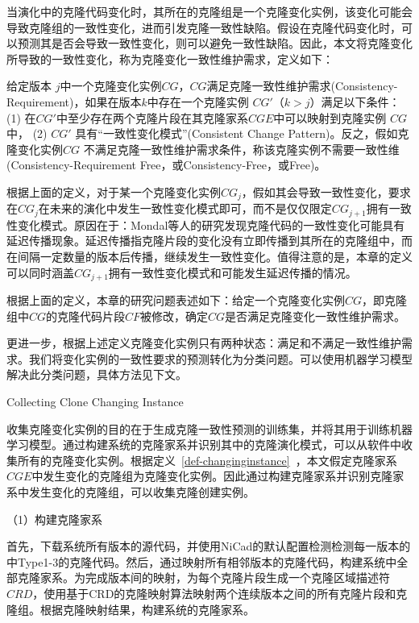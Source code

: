 当演化中的克隆代码变化时，其所在的克隆组是一个克隆变化实例，该变化可能会导致克隆组的一致性变化，进而引发克隆一致性缺陷。假设在克隆代码变化时，可以预测其是否会导致一致性变化，则可以避免一致性缺陷。因此，本文将克隆变化所导致的一致性变化，称为克隆变化一致性维护需求，定义如下：

\begin{definition}[克隆变化一致性维护需求] 
 \label{def-changingrequirement}
给定版本 $j$中一个克隆变化实例$CG$，$CG$满足克隆一致性维护需求(Consistency-Requirement)，如果在版本$k$中存在一个克隆实例 $CG'$（$k>j$）满足以下条件： (1) 在$CG'$中至少存在两个克隆片段在其克隆家系$CGE$中可以映射到克隆实例 $CG$中， (2) $CG'$ 具有“一致性变化模式”(Consistent Change Pattern)。反之，假如克隆变化实例$CG$ 不满足克隆一致性维护需求条件，称该克隆实例不需要一致性维(Consistency-Requirement Free，或Consistency-Free，或Free)。
\end{definition}

根据上面的定义，对于某一个克隆变化实例$CG_j$，假如其会导致一致性变化，要求在$CG_j$在未来的演化中发生一致性变化模式即可，而不是仅仅限定$CG_{j+1}$拥有一致性变化模式。原因在于：Mondal等人的研究发现克隆代码的一致性变化可能具有延迟传播现象。延迟传播指克隆片段的变化没有立即传播到其所在的克隆组中，而在间隔一定数量的版本后传播，继续发生一致性变化\cite{mondal2016comparative}。值得注意的是，本章的定义可以同时涵盖$CG_{j+1}$拥有一致性变化模式和可能发生延迟传播的情况。

根据上面的定义，本章的研究问题表述如下：给定一个克隆变化实例$CG$，即克隆组中$CG$的克隆代码片段$CF$被修改，确定$CG$是否满足克隆变化一致性维护需求。

更进一步，根据上述定义克隆变化实例只有两种状态：满足和不满足一致性维护需求。我们将变化实例的一致性要求的预测转化为分类问题。可以使用机器学习模型解决此分类问题，具体方法见下文。

{Collecting Clone Changing Instance}

收集克隆变化实例的目的在于生成克隆一致性预测的训练集，并将其用于训练机器学习模型。通过构建系统的克隆家系并识别其中的克隆演化模式，可以从软件中收集所有的克隆变化实例。根据定义~\ref{def-changinginstance}~，本文假定克隆家系$CGE$中发生变化的克隆组为克隆变化实例。因此通过构建克隆家系并识别克隆家系中发生变化的克隆组，可以收集克隆创建实例。

（1）构建克隆家系

首先，下载系统所有版本的源代码，并使用NiCad的默认配置检测检测每一版本的中Type1-3的克隆代码。然后，通过映射所有相邻版本的克隆代码，构建系统中全部克隆家系。为完成版本间的映射，为每个克隆片段生成一个克隆区域描述符 $CRD$\cite{duala2010clone}，使用基于CRD的克隆映射算法映射两个连续版本之间的所有克隆片段和克隆组\cite{ci2013new}\cite{ci2013newD}。根据克隆映射结果，构建系统的克隆家系。

